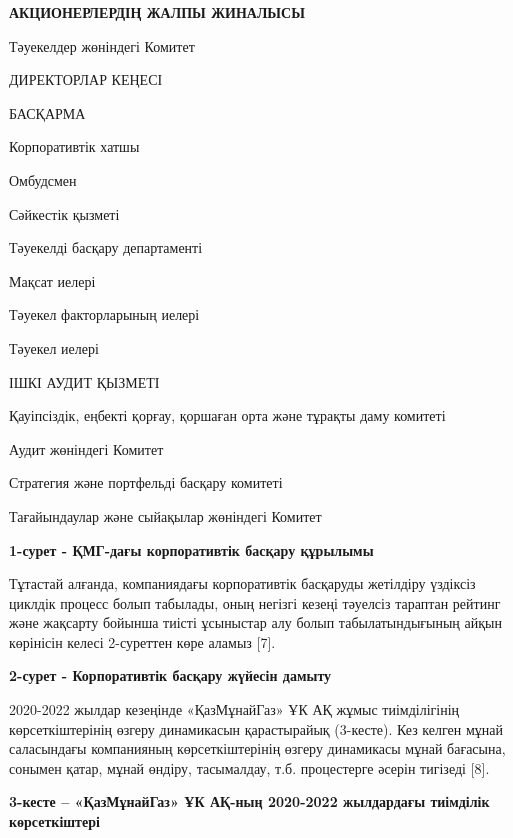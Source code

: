 {\bfseries АКЦИОНЕРЛЕРДІҢ ЖАЛПЫ ЖИНАЛЫСЫ}

Тәуекелдер жөніндегі Комитет

ДИРЕКТОРЛАР КЕҢЕСІ

БАСҚАРМА

Корпоративтік хатшы

Омбудсмен

Сәйкестік қызметі

Тәуекелді басқару департаменті

Мақсат иелері

Тәуекел факторларының иелері

Тәуекел иелері

ІШКІ АУДИТ ҚЫЗМЕТІ

Қауіпсіздік, еңбекті қорғау, қоршаған орта және тұрақты даму комитеті

Аудит жөніндегі Комитет

Стратегия және портфельді басқару комитеті

Тағайындаулар және сыйақылар жөніндегі Комитет

{\bfseries 1-сурет - ҚМГ-дағы корпоративтік басқару құрылымы}

Тұтастай алғанда, компаниядағы корпоративтік басқаруды жетілдіру
үздіксіз циклдік процесс болып табылады, оның негізгі кезеңі тәуелсіз
тараптан рейтинг және жақсарту бойынша тиісті ұсыныстар алу болып
табылатындығының айқын көрінісін келесі 2-суреттен көре аламыз {[}7{]}.

{\bfseries 2-сурет - Корпоративтік басқару жүйесін дамыту}

2020-2022 жылдар кезеңінде «ҚазМұнайГаз» ҰК АҚ жұмыс тиімділігінің
көрсеткіштерінің өзгеру динамикасын қарастырайық (3-кесте). Кез келген
мұнай саласындағы компанияның көрсеткіштерінің өзгеру динамикасы мұнай
бағасына, сонымен қатар, мұнай өндіру, тасымалдау, т.б. процестерге
әсерін тигізеді {[}8{]}.

{\bfseries 3-кесте -- «ҚазМұнайГаз» ҰК АҚ-ның 2020-2022 жылдардағы
тиімділік көрсеткіштері}

